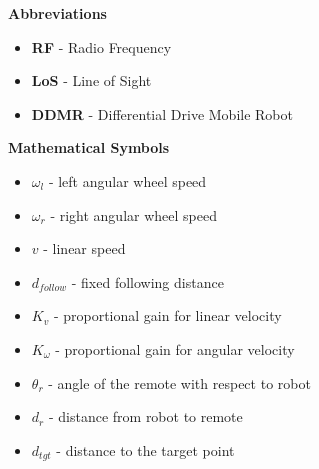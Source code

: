 
\renewcommand{\nomname}{Nomenclature}
\renewcommand{\nomAname}{\textbf{\large Abbreviations}}
\renewcommand{\nomGname}{\textbf{\large Mathematical Symbols}}
\renewcommand{\nomXname}{\textbf{\large Superscripts}}
\renewcommand{\nomZname}{\textbf{\large Subscripts}}

\printnomenclature
\cleardoublepage
{} %


\nomAname
\begin{itemize}
    \item[]\textbf{RF} - Radio Frequency
    \item[]\textbf{LoS} - Line of Sight
    \item[]\textbf{DDMR} - Differential Drive Mobile Robot
      
\end{itemize}
\bigbreak

\nomGname
\begin{itemize}
	\item[]$\omega_l$ - left angular wheel speed
	\item[]$\omega_r$ - right angular wheel speed
	\item[]$v$ - linear speed
	\item[]$d_{follow}$ - fixed following distance 
    \item[]$K_v$ - proportional gain for linear velocity
    \item[]$K_\omega$ - proportional gain for angular velocity
    \item[]$\theta_r$ - angle of the remote with respect to robot
    \item[]$d_r$ - distance from robot to remote
    \item[]$d_{tgt}$ - distance to the target point

\end{itemize}


